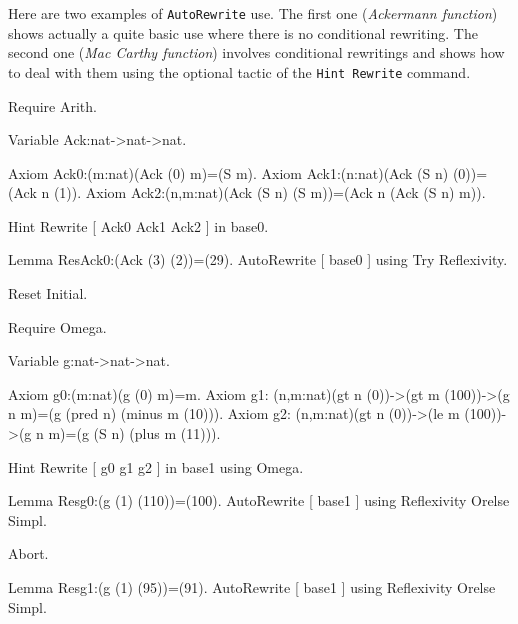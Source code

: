 \begin{coq_example*}
Here are two examples of {\tt AutoRewrite} use. The first one ({\em Ackermann
function}) shows actually a quite basic use where there is no conditional
rewriting. The second one ({\em Mac Carthy function}) involves conditional
rewritings and shows how to deal with them using the optional tactic of the
{\tt Hint~Rewrite} command.

\firstexample
{}

\begin{coq_example*}
Require Arith.

Variable Ack:nat->nat->nat.

Axiom Ack0:(m:nat)(Ack (0) m)=(S m).
Axiom Ack1:(n:nat)(Ack (S n) (0))=(Ack n (1)).
Axiom Ack2:(n,m:nat)(Ack (S n) (S m))=(Ack n (Ack (S n) m)).
\end{coq_example*}

\begin{coq_example}
Hint Rewrite [ Ack0 Ack1 Ack2 ] in base0.

Lemma ResAck0:(Ack (3) (2))=(29).
AutoRewrite [ base0 ] using Try Reflexivity.
\end{coq_example}

\begin{coq_eval}
Reset Initial.  
\end{coq_eval}


\begin{coq_example*}
Require Omega.

Variable g:nat->nat->nat.

Axiom g0:(m:nat)(g (0) m)=m.
Axiom g1:
  (n,m:nat)(gt n (0))->(gt m (100))->(g n m)=(g (pred n) (minus m (10))).
Axiom g2:
  (n,m:nat)(gt n (0))->(le m (100))->(g n m)=(g (S n) (plus m (11))).
\end{coq_example*}

\begin{coq_example}
Hint Rewrite [ g0 g1 g2 ] in base1 using Omega.

Lemma Resg0:(g (1) (110))=(100).
AutoRewrite [ base1 ] using Reflexivity Orelse Simpl.
\end{coq_example}

\begin{coq_eval}
Abort.
\end{coq_eval}

\begin{coq_example}
Lemma Resg1:(g (1) (95))=(91).
AutoRewrite [ base1 ] using Reflexivity Orelse Simpl.
\end{coq_example}


\end{coq_example*}

